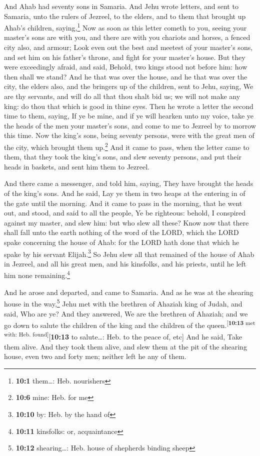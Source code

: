  And Ahab had seventy sons in Samaria. And Jehu wrote
letters, and sent to Samaria, unto the rulers of Jezreel, to the elders,
and to them that brought up Ahab's children, saying,\footnote{\textbf{10:1}
  them\ldots: Heb. nourishers}  Now as soon as this letter
cometh to you, seeing your master's sons are with you, and there are
with you chariots and horses, a fenced city also, and armour;
 Look even out the best and meetest of your master's sons,
and set him on his father's throne, and fight for your master's house.
 But they were exceedingly afraid, and said, Behold, two
kings stood not before him: how then shall we stand?  And
he that was over the house, and he that was over the city, the elders
also, and the bringers up of the children, sent to Jehu, saying, We are
thy servants, and will do all that thou shalt bid us; we will not make
any king: do thou that which is good in thine eyes.  Then
he wrote a letter the second time to them, saying, If ye be mine, and if
ye will hearken unto my voice, take ye the heads of the men your
master's sons, and come to me to Jezreel by to morrow this time. Now the
king's sons, being seventy persons, were with the great men of the city,
which brought them up.\footnote{\textbf{10:6} mine: Heb. for me}
 And it came to pass, when the letter came to them, that
they took the king's sons, and slew seventy persons, and put their heads
in baskets, and sent him them to Jezreel.

 And there came a messenger, and told him, saying, They
have brought the heads of the king's sons. And he said, Lay ye them in
two heaps at the entering in of the gate until the morning.
 And it came to pass in the morning, that he went out, and
stood, and said to all the people, Ye be righteous: behold, I conspired
against my master, and slew him: but who slew all these? 
Know now that there shall fall unto the earth nothing of the word of the
LORD, which the LORD spake concerning the house of Ahab: for the LORD
hath done that which he spake by his servant Elijah.\footnote{\textbf{10:10}
  by: Heb. by the hand of}  So Jehu slew all that
remained of the house of Ahab in Jezreel, and all his great men, and his
kinsfolks, and his priests, until he left him none remaining.\footnote{\textbf{10:11}
  kinsfolks: or, acquaintance}

 And he arose and departed, and came to Samaria. And as
he was at the shearing house in the way,\footnote{\textbf{10:12}
  shearing\ldots: Heb. house of shepherds binding sheep} 
Jehu met with the brethren of Ahaziah king of Judah, and said, Who are
ye? And they answered, We are the brethren of Ahaziah; and we go down to
salute the children of the king and the children of the
queen.\textsuperscript{{[}\textbf{10:13} met with: Heb.
found{]}}{[}\textbf{10:13} to salute\ldots: Heb. to the peace of, etc{]}
 And he said, Take them alive. And they took them alive,
and slew them at the pit of the shearing house, even two and forty men;
neither left he any of them.

